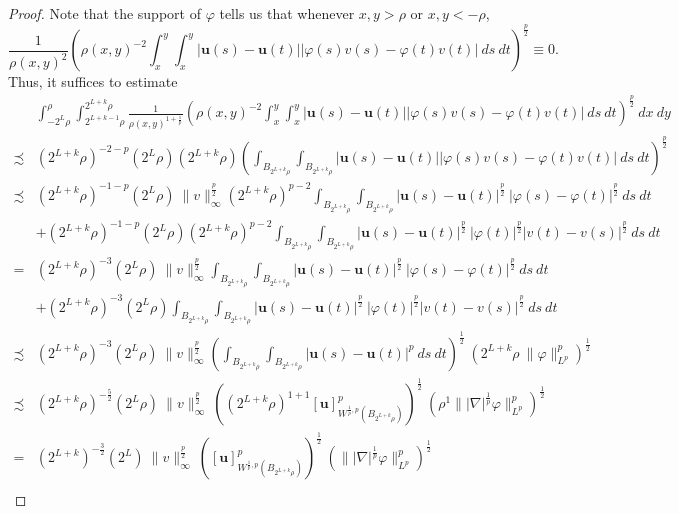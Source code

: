 \documentclass[a4paper,10pt,intlimits,ngerman]{amsart}
\newcommand{\iv}{B} %
\numberwithin{equation}{section}
\newcommand{\solu}{{\boldsymbol{u}}}
\newcommand{\aleq}{\precsim}
\newcommand{\laps}[1]{|\nabla|^{#1}}
\newcommand{\brac}[1]{\left ( #1 \right )}
\begin{document}
\begin{appendix}
\begin{proof}
Note that the support of $\varphi$ tells us that whenever $x,y > \rho$ or $x,y < -\rho$,
\[
\frac{1}{\rho(x,y)^{2}} \brac{\rho(x,y)^{-2} \int_x^y \int_x^y |\solu(s)-\solu(t)||\varphi(s) v(s) - \varphi(t) v(t)|\ ds\ dt}^{\frac{p}{2}} \equiv 0.
\]
Thus, it suffices to estimate 
\[
\begin{split}
 &\int_{-2^L \rho}^{\rho}\int_{2^{L+k-1} \rho}^{2^{L+k}\rho} \frac{1}{\rho(x,y)^{1+\frac{1}{p}}} \brac{\rho(x,y)^{-2} \int_x^y \int_x^y |\solu(s)-\solu(t)||\varphi(s) v(s) - \varphi(t) v(t)|\ ds\ dt}^{\frac{p}{2}}\ dx\ dy\\
 \aleq& (2^{L+k} \rho)^{-2-p} (2^L \rho) (2^{L+k} \rho) \brac{\int_{\iv_{2^{L+k}\rho}} \int_{\iv_{2^{L+k}\rho}} |\solu(s)-\solu(t)||\varphi(s) v(s) - \varphi(t) v(t)|\ ds\ dt}^{\frac{p}{2}}\\
 \aleq& (2^{L+k} \rho)^{-1-p} (2^L \rho)\ \|v\|_\infty^{\frac{p}{2}} (2^{L+k} \rho)^{p-2} \int_{\iv_{2^{L+k}\rho}} \int_{\iv_{2^{L+k}\rho}} |\solu(s)-\solu(t)|^{\frac{p}{2}}\ |\varphi(s) - \varphi(t) |^{\frac{p}{2}}\ ds\ dt\\
 &+ (2^{L+k} \rho)^{-1-p} (2^L \rho)  (2^{L+k} \rho)^{p-2} \int_{\iv_{2^{L+k}\rho}} \int_{\iv_{2^{L+k}\rho}} |\solu(s)-\solu(t)|^{\frac{p}{2}}\ |\varphi(t)|^{\frac{p}{2}} |v(t)-v(s)|^{\frac{p}{2}}\ ds\ dt\\
 =& (2^{L+k} \rho)^{-3} (2^L \rho)\ \|v\|_\infty^{\frac{p}{2}} \int_{\iv_{2^{L+k}\rho}} \int_{\iv_{2^{L+k}\rho}} |\solu(s)-\solu(t)|^{\frac{p}{2}}\ |\varphi(s) - \varphi(t) |^{\frac{p}{2}}\ ds\ dt\\
 &+ (2^{L+k} \rho)^{-3} (2^L \rho)   \int_{\iv_{2^{L+k}\rho}} \int_{\iv_{2^{L+k}\rho}} |\solu(s)-\solu(t)|^{\frac{p}{2}}\ |\varphi(t)|^{\frac{p}{2}} |v(t)-v(s)|^{\frac{p}{2}}\ ds\ dt\\
 \aleq& (2^{L+k} \rho)^{-3} (2^L \rho)\ \|v\|_\infty^{\frac{p}{2}} \brac{\int_{\iv_{2^{L+k}\rho}} \int_{\iv_{2^{L+k}\rho}} |\solu(s)-\solu(t)|^{p}\ ds\ dt}^{\frac{1}{2}}\ \brac{2^{L+k} \rho\ \|\varphi\|^p_{L^p}}^{\frac{1}{2}}\\
 \aleq& (2^{L+k} \rho)^{-\frac{5}{2}} (2^L \rho)\ \|v\|_\infty^{\frac{p}{2}}\ \brac{(2^{L+k} \rho )^{1+1} [\solu]_{W^{\frac{1}{p},p}(\iv_{2^{L+k}\rho }) }^p}^{\frac{1}{2}}\ \brac{\rho^{1} \|\laps{\frac{1}{p}}\varphi\|_{L^{p}}^p }^{\frac{1}{2}}\\
  =& (2^{L+k} )^{-\frac{3}{2}} (2^L )\ \|v\|_\infty^{\frac{p}{2}}\ \brac{[\solu]_{W^{\frac{1}{p},p}(\iv_{2^{L+k}\rho }) }^p}^{\frac{1}{2}}\ \brac{ \|\laps{\frac{1}{p}}\varphi\|_{L^{p}}^p }^{\frac{1}{2}}\\
 \end{split}
 \]

\end{proof}


\end{appendix}


%
%
\end{document}

